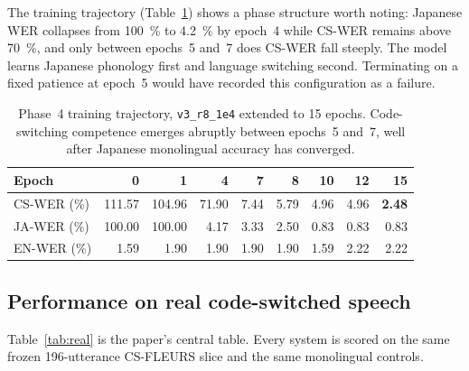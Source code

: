 \documentclass[11pt,a4paper]{article}
\newcommand{\best}[1]{\textbf{#1}}
\begin{document}
The training trajectory (Table~\ref{tab:phase4}) shows a phase structure worth
noting: Japanese WER collapses from \SI{100}{\percent} to \SI{4.2}{\percent} by
epoch~4 while CS-WER remains above \SI{70}{\percent}, and only between epochs~5
and~7 does CS-WER fall steeply. The model learns Japanese phonology first and
language switching second. Terminating on a fixed patience at epoch~5 would have
recorded this configuration as a failure.

\begin{table}[t]
\centering
\caption{Phase~4 training trajectory, \texttt{v3\_r8\_1e4} extended to 15 epochs.
Code-switching competence emerges abruptly between epochs~5 and~7, well after
Japanese monolingual accuracy has converged.}
\label{tab:phase4}
\small
\begin{tabular}{lrrrrrrrr}
\toprule
Epoch & 0 & 1 & 4 & 7 & 8 & 10 & 12 & 15 \\
\midrule
CS-WER (\%) & 111.57 & 104.96 & 71.90 & 7.44 & 5.79 & 4.96 & 4.96 & \best{2.48} \\
JA-WER (\%) & 100.00 & 100.00 & 4.17 & 3.33 & 2.50 & 0.83 & 0.83 & 0.83 \\
EN-WER (\%) & 1.59 & 1.90 & 1.90 & 1.90 & 1.90 & 1.59 & 2.22 & 2.22 \\
\bottomrule
\end{tabular}
\end{table}

\subsection{Performance on real code-switched speech}

Table~\ref{tab:real} is the paper's central table. Every system is scored on the
same frozen 196-utterance CS-FLEURS slice and the same monolingual controls.
\end{document}
